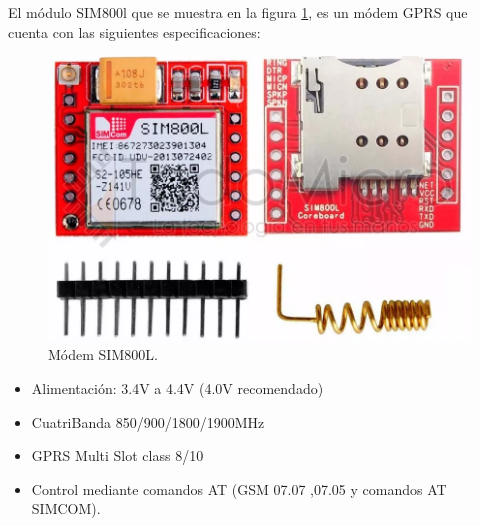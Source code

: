 El módulo SIM800l que se muestra en la figura \ref{fig:sim800l}, es un módem GPRS que cuenta con las siguientes especificaciones:

\begin{figure}[!htb]
  \centering
  \includegraphics[scale=0.2]{./Figures/sim800.png}
  \caption{Módem SIM800L.}
  \label{fig:sim800l}
\end{figure}

\begin{itemize}
  \item Alimentación: 3.4V a 4.4V (4.0V recomendado)
  \item  CuatriBanda 850/900/1800/1900MHz
  \item  GPRS Multi Slot class 8/10
  \item  Control mediante comandos AT (GSM 07.07 ,07.05 y comandos AT SIMCOM).
\end{itemize}


